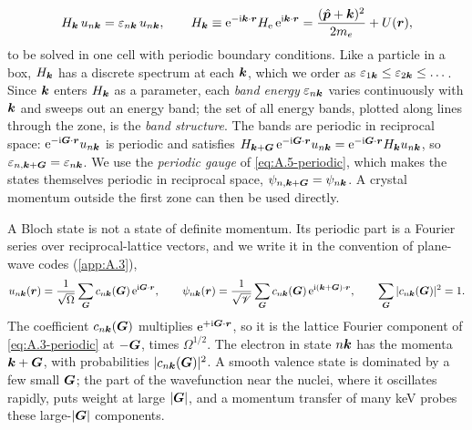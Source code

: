\begin{equation}
  H_{\bm{k}}\,u_{n\bm{k}} = \varepsilon_{n\bm{k}}\,u_{n\bm{k}}, \qquad
  H_{\bm{k}} \equiv \mathrm{e}^{-\mathrm{i}\bm{k}\cdot\bm{r}}H_{\mathrm{e}}\,\mathrm{e}^{\mathrm{i}\bm{k}\cdot\bm{r}} = \frac{(\hat{\bm{p}} + \bm{k})^2}{2m_e} + U(\bm{r}) ,
  \label{eq:3.2-Hk}
\end{equation}
to be solved in one cell with periodic boundary conditions. Like a particle in a box, $H_{\bm{k}}$ has a discrete spectrum at each $\bm{k}$, which we order as $\varepsilon_{1\bm{k}} \le \varepsilon_{2\bm{k}} \le \dots$. Since $\bm{k}$ enters $H_{\bm{k}}$ as a parameter, each \emph{band energy} $\varepsilon_{n\bm{k}}$ varies continuously with $\bm{k}$ and sweeps out an energy band; the set of all energy bands, plotted along lines through the zone, is the \emph{band structure}. The bands are periodic in reciprocal space: $\mathrm{e}^{-\mathrm{i}\bm{G}\cdot\bm{r}}u_{n\bm{k}}$ is periodic and satisfies $H_{\bm{k}+\bm{G}}\,\mathrm{e}^{-\mathrm{i}\bm{G}\cdot\bm{r}}u_{n\bm{k}} = \mathrm{e}^{-\mathrm{i}\bm{G}\cdot\bm{r}}H_{\bm{k}}u_{n\bm{k}}$, so $\varepsilon_{n,\bm{k}+\bm{G}} = \varepsilon_{n\bm{k}}$. We use the \emph{periodic gauge} of \cref{eq:A.5-periodic}, which makes the states themselves periodic in reciprocal space, $\psi_{n,\bm{k}+\bm{G}} = \psi_{n\bm{k}}$. A crystal momentum outside the first zone can then be used directly.

A Bloch state is not a state of definite momentum. Its periodic part is a Fourier series over reciprocal-lattice vectors, and we write it in the convention of plane-wave codes (\cref{app:A.3}),
\begin{equation}
  u_{n\bm{k}}(\bm{r}) = \frac{1}{\sqrt\Omega}\sum_{\bm{G}}c_{n\bm{k}}(\bm{G})\,\mathrm{e}^{\mathrm{i}\bm{G}\cdot\bm{r}}, \qquad
  \psi_{n\bm{k}}(\bm{r}) = \frac{1}{\sqrt {\mathscr{V}}}\sum_{\bm{G}}c_{n\bm{k}}(\bm{G})\,\mathrm{e}^{\mathrm{i}(\bm{k}+\bm{G})\cdot\bm{r}}, \qquad
  \sum_{\bm{G}}|c_{n\bm{k}}(\bm{G})|^2 = 1 .
  \label{eq:3.2-pw}
\end{equation}
The coefficient $c_{n\bm{k}}(\bm{G})$ multiplies $\mathrm{e}^{+\mathrm{i}\bm{G}\cdot\bm{r}}$, so it is the lattice Fourier component of \cref{eq:A.3-periodic} at $-\bm{G}$, times $\Omega^{1/2}$. The electron in state $n\bm{k}$ has the momenta $\bm{k} + \bm{G}$, with probabilities $|c_{n\bm{k}}(\bm{G})|^2$. A smooth valence state is dominated by a few small $\bm{G}$; the part of the wavefunction near the nuclei, where it oscillates rapidly, puts weight at large $|\bm{G}|$, and a momentum transfer of many keV probes these large-$|\bm{G}|$ components.

